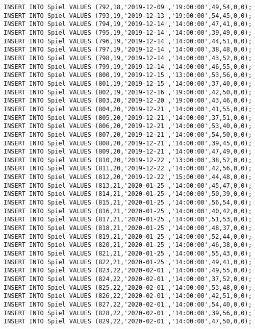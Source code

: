 \documentclass{lehramt-informatik-aufgabe}
\begin{document}
\begin{verbatim}
INSERT INTO Spiel VALUES (792,18,'2019-12-09','19:00:00',49,54,0,0);
INSERT INTO Spiel VALUES (793,19,'2019-12-13','19:00:00',54,45,0,0);
INSERT INTO Spiel VALUES (794,19,'2019-12-14','14:00:00',47,41,0,0);
INSERT INTO Spiel VALUES (795,19,'2019-12-14','14:00:00',39,49,0,0);
INSERT INTO Spiel VALUES (796,19,'2019-12-14','14:00:00',44,51,0,0);
INSERT INTO Spiel VALUES (797,19,'2019-12-14','14:00:00',38,48,0,0);
INSERT INTO Spiel VALUES (798,19,'2019-12-14','14:00:00',43,52,0,0);
INSERT INTO Spiel VALUES (799,19,'2019-12-14','14:00:00',46,55,0,0);
INSERT INTO Spiel VALUES (800,19,'2019-12-15','13:00:00',53,56,0,0);
INSERT INTO Spiel VALUES (801,19,'2019-12-15','14:00:00',37,40,0,0);
INSERT INTO Spiel VALUES (802,19,'2019-12-16','19:00:00',42,50,0,0);
INSERT INTO Spiel VALUES (803,20,'2019-12-20','19:00:00',43,46,0,0);
INSERT INTO Spiel VALUES (804,20,'2019-12-21','14:00:00',41,55,0,0);
INSERT INTO Spiel VALUES (805,20,'2019-12-21','14:00:00',37,51,0,0);
INSERT INTO Spiel VALUES (806,20,'2019-12-21','14:00:00',53,40,0,0);
INSERT INTO Spiel VALUES (807,20,'2019-12-21','14:00:00',54,50,0,0);
INSERT INTO Spiel VALUES (808,20,'2019-12-21','14:00:00',39,45,0,0);
INSERT INTO Spiel VALUES (809,20,'2019-12-21','14:00:00',47,49,0,0);
INSERT INTO Spiel VALUES (810,20,'2019-12-22','13:00:00',38,52,0,0);
INSERT INTO Spiel VALUES (811,20,'2019-12-22','14:00:00',42,56,0,0);
INSERT INTO Spiel VALUES (812,20,'2019-12-22','15:00:00',44,48,0,0);
INSERT INTO Spiel VALUES (813,21,'2020-01-25','14:00:00',45,47,0,0);
INSERT INTO Spiel VALUES (814,21,'2020-01-25','14:00:00',50,39,0,0);
INSERT INTO Spiel VALUES (815,21,'2020-01-25','14:00:00',56,54,0,0);
INSERT INTO Spiel VALUES (816,21,'2020-01-25','14:00:00',40,42,0,0);
INSERT INTO Spiel VALUES (817,21,'2020-01-25','14:00:00',51,53,0,0);
INSERT INTO Spiel VALUES (818,21,'2020-01-25','14:00:00',48,37,0,0);
INSERT INTO Spiel VALUES (819,21,'2020-01-25','14:00:00',52,44,0,0);
INSERT INTO Spiel VALUES (820,21,'2020-01-25','14:00:00',46,38,0,0);
INSERT INTO Spiel VALUES (821,21,'2020-01-25','14:00:00',55,43,0,0);
INSERT INTO Spiel VALUES (822,21,'2020-01-25','14:00:00',49,41,0,0);
INSERT INTO Spiel VALUES (823,22,'2020-02-01','14:00:00',49,55,0,0);
INSERT INTO Spiel VALUES (824,22,'2020-02-01','14:00:00',37,52,0,0);
INSERT INTO Spiel VALUES (825,22,'2020-02-01','14:00:00',53,48,0,0);
INSERT INTO Spiel VALUES (826,22,'2020-02-01','14:00:00',42,51,0,0);
INSERT INTO Spiel VALUES (827,22,'2020-02-01','14:00:00',54,40,0,0);
INSERT INTO Spiel VALUES (828,22,'2020-02-01','14:00:00',39,56,0,0);
INSERT INTO Spiel VALUES (829,22,'2020-02-01','14:00:00',47,50,0,0);

\end{verbatim}
\end{document}
